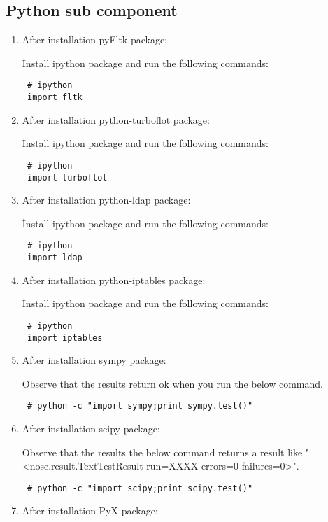 \documentclass[a4paper,10pt]{article}
\begin{document}
\subsection{Python sub component}

\begin{enumerate}
\item After installation pyFltk package:

İnstall ipython package and run the following commands:
\begin{verbatim}
 # ipython
 import fltk
\end{verbatim}


\item After installation python-turboflot package:

İnstall ipython package and run the following commands:
\begin{verbatim}
 # ipython
 import turboflot
\end{verbatim}

\item After installation python-ldap package:

İnstall ipython package and run the following commands:
\begin{verbatim}
 # ipython
 import ldap
\end{verbatim}

\item After installation python-iptables package:

İnstall ipython package and run the following commands:
\begin{verbatim}
 # ipython
 import iptables
\end{verbatim}

\item After installation sympy package:

Observe that the results return ok when you run the below command.
\begin{verbatim}
 # python -c "import sympy;print sympy.test()"
\end{verbatim}


\item After installation scipy package:

Observe that the results the below command returns a result like "<nose.result.TextTestResult run=XXXX errors=0 failures=0>".
\begin{verbatim}
 # python -c "import scipy;print scipy.test()"
\end{verbatim}

\item After installation PyX package:


\end{enumerate}
\end{document}
